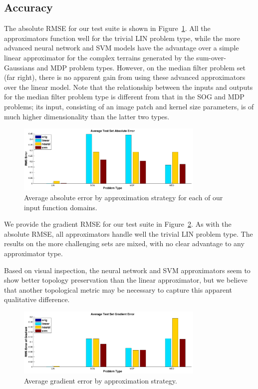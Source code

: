 \documentclass{article}
\begin{document}
\subsection{Accuracy}

The absolute RMSE for our test suite is shown in Figure~\ref{fig:results_absolute_rmse}. All the approximators function well for the trivial LIN problem type, while the more advanced neural network and SVM models have the advantage over a simple linear approximator for the complex terrains generated by the sum-over-Gaussians and MDP problem types. However, on the median filter problem set (far right), there is no apparent gain from using these advanced approximators over the linear model. Note that the relationship between the inputs and outputs for the median filter problem type is different from that in the SOG and MDP problems; its input, consisting of an image patch and kernel size parameters, is of much higher dimensionality than the latter two types.

\begin{figure}
  \centering
  \includegraphics[width=0.8\textwidth]{images/results_rmse}
  \caption{Average absolute error by approximation strategy for each of our input function domains.}
  \label{fig:results_absolute_rmse}
\end{figure}

We provide the gradient RMSE for our test suite in Figure~\ref{fig:results_grad_rmse}. As with the absolute RMSE, all approximators handle well the trivial LIN problem type. The results on the more challenging sets are mixed, with no clear advantage to any approximator type.

Based on visual inspection, the neural network and SVM approximators seem to show better topology preservation than the linear approximator, but we believe that another topological metric may be necessary to capture this apparent qualitative difference.

\begin{figure}
  \centering
  \includegraphics[width=0.8\textwidth]{images/results_grad_rmse}
  \caption{Average gradient error by approximation strategy. }
  \label{fig:results_grad_rmse}
\end{figure}
\end{document}
